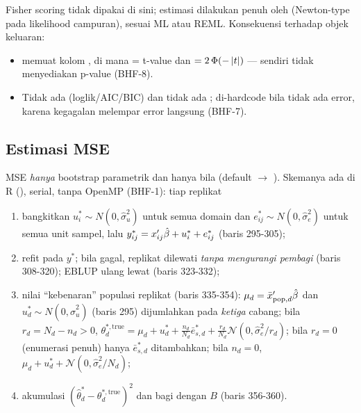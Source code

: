 Fisher scoring tidak dipakai di sini; estimasi dilakukan penuh oleh
 (Newton-type pada likelihood campuran), sesuai
 ML atau REML. Konsekuensi terhadap objek keluaran:
\begin{itemize}
  \item {} memuat kolom , di mana  = t-value 
        dan  $=2\,\Phi(-\left|t\right|)$ ---  sendiri tidak
        menyediakan p-value (BHF-8).
  \item Tidak ada  (loglik/AIC/BIC) dan tidak ada
        ;  di-hardcode  bila tidak
        ada error, karena kegagalan  melempar error langsung
        (BHF-7).
\end{itemize}

\subsection{Estimasi MSE}\label{sec:bhf-mse}

MSE \emph{hanya} bootstrap parametrik dan hanya bila
 (default  $\to$
). Skemanya ada di R (),
serial, tanpa OpenMP (BHF-1): tiap replikat
\begin{enumerate}[label=\arabic*.]
  \item bangkitkan $u_i^\ast\sim N(0,\hat\sigma_u^2)$ untuk semua domain dan
        $e_{ij}^\ast\sim N(0,\hat\sigma_e^2)$ untuk semua unit sampel, lalu
        $y_{ij}^\ast=x_{ij}'\hat\beta+u_{i}^\ast+e_{ij}^\ast$ (baris 295-305);
  \item refit  pada $y^\ast$; bila gagal, replikat dilewati
        \emph{tanpa mengurangi pembagi} (baris 308-320); EBLUP ulang lewat
         (baris 323-332);
  \item nilai ``kebenaran'' populasi replikat (baris 335-354):
        $\mu_d=\bar x_{\text{pop},d}'\hat\beta$ dan $u^\ast_d\sim
        N(0,\hat\sigma_u^2)$ (baris 295) dijumlahkan pada \emph{ketiga}
        cabang; bila $r_d=N_d-n_d>0$,
        $\theta^{\ast,\text{true}}_d=\mu_d+u^\ast_d+\tfrac{n_d}{N_d}\bar e^\ast_{s,d}
        +\tfrac{r_d}{N_d}\mathcal N(0,\hat\sigma_e^2/r_d)$;
        bila $r_d=0$ (enumerasi penuh) hanya $\bar e^\ast_{s,d}$ ditambahkan;
        bila
        $n_d=0$, $\mu_d+u^\ast_d+\mathcal N(0,\hat\sigma_e^2/N_d)$;
  \item akumulasi $(\hat\theta_d^\ast-\theta_d^{\ast,\text{true}})^2$ dan
        bagi dengan $B$ (baris 356-360).
\end{enumerate}

